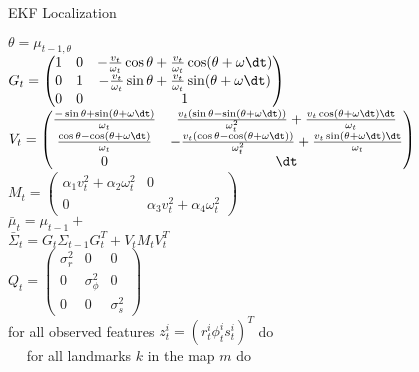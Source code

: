 \begin{algorithm}[H]
\caption{EKF Localization}
\BlankLine
$\theta = \mu_{t-1, \theta}$\\
\BlankLine
$G_t = \begin{pmatrix} 1 & 0 & -\frac{v_t}{\omega_t}\cos \theta + \frac{v_t}{\omega_t}\cos (\theta + \omega \dt) \\ 0 & 1 & -\frac{v_t}{\omega_t}\sin \theta + \frac{v_t}{\omega_t}\sin (\theta + \omega \dt) \\ 0 & 0 & 1 \end{pmatrix} $\\
\BlankLine
$V_t = \begin{pmatrix}\frac{-\sin\theta + \sin(\theta+\omega\dt)}{\omega_t} &  \frac{v_t(\sin\theta - \sin(\theta+\omega\dt))}{\omega_t^2} + \frac{v_t\cos(\theta+\omega\dt) \dt}{\omega_t} \\
\frac{\cos\theta - \cos(\theta+\omega\dt)}{\omega_t} & -\frac{v_t(\cos\theta - \cos(\theta+\omega\dt))}{\omega_t^2} + \frac{v_t\sin(\theta+\omega\dt) \dt}{\omega_t} \\
0 & \dt \end{pmatrix}$\\
\BlankLine
$M_t = \begin{pmatrix} \alpha_1 v_t^2 + \alpha_2 \omega_t^2 & 0 \\ 0 & \alpha_3 v_t^2 + \alpha_4\omega_t^2 \end{pmatrix}$\\
\BlankLine
$\bar{\mu}_t = \mu_{t-1} + $\\
\BlankLine
$\bar{\Sigma}_t = G_t \Sigma_{t-1} G_t^T + V_t M_t V_t^T$\\
\BlankLine
$Q_t = \begin{pmatrix} \sigma_r^2 & 0 & 0 \\ 0 & \sigma_{\phi}^2 & 0 \\ 0 & 0 & \sigma_s^2 \end{pmatrix}$\\
\BlankLine
for all observed features $z_t^i = (r_t^i \phi_t^i s_t^i)^T$ do\\
$\quad$ for all landmarks $k$ in the map $m$ do\\


\end{algorithm}
